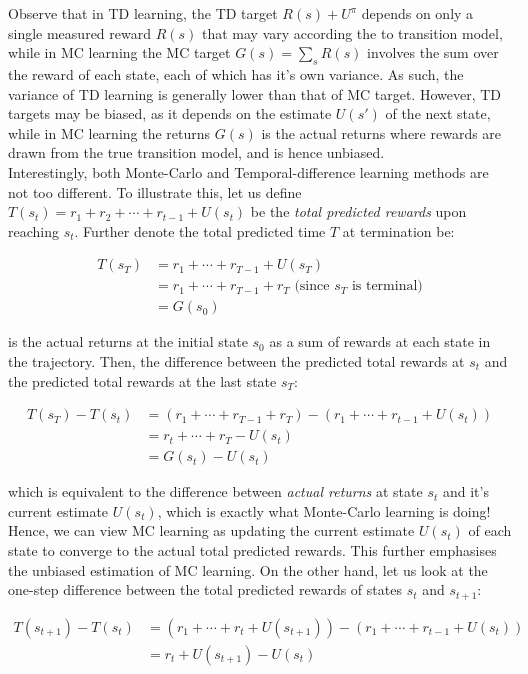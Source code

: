 \documentclass[11pt]{article}
\begin{document}
Observe that in TD learning, the TD target $R(s) + U^{\pi}$ depends on only a single measured reward $R(s)$ that may vary according the to transition model, while in MC learning the MC target $G(s) = \sum_{s} R(s)$ involves the sum over the reward of each state, each of which has it's own variance. As such, the variance of TD learning is generally lower than that of MC target. However, TD targets may be biased, as it depends on the estimate $U(s')$ of the next state, while in MC learning the returns $G(s)$ is the actual returns where rewards are drawn from the true transition model, and is hence unbiased.\\

Interestingly, both Monte-Carlo and Temporal-difference learning methods are not too different. To illustrate this, let us define $T(s_t) = r_1 + r_2 + \cdots + r_{t-1} + U(s_t)$ be the \textit{total predicted rewards} upon reaching $s_t$. Further denote the total predicted time $T$ at termination be:

$$
\begin{aligned}
T(s_T) &= r_1 + \cdots + r_{T-1} + U(s_T)\\
&= r_1 + \cdots + r_{T-1} + r_T \text{ (since $s_T$ is terminal)}\\
&= G(s_0)
\end{aligned}
$$

is the actual returns at the initial state $s_0$ as a sum of rewards at each state in the trajectory. Then, the difference between the predicted total rewards at $s_t$ and the predicted total rewards at the last state $s_T$:

$$
\begin{aligned}
T(s_T) - T(s_t) &= (r_1 + \cdots + r_{T-1} + r_T) - (r_1 + \cdots + r_{t-1} + U(s_t)) \\
&= r_t + \cdots + r_T - U(s_t) \\
&= G(s_t) - U(s_t)
\end{aligned}
$$

which is equivalent to the difference between \textit{actual returns} at state $s_t$ and it's current estimate $U(s_t)$, which is exactly what Monte-Carlo learning is doing! Hence, we can view MC learning as updating the current estimate $U(s_t)$ of each state to converge to the actual total predicted rewards. This further emphasises the unbiased estimation of MC learning. On the other hand, let us look at the one-step difference between the total predicted rewards of states $s_t$ and $s_{t+1}$:

$$
\begin{aligned}
T(s_{t+1}) - T(s_t) &= (r_1 + \cdots + r_t + U(s_{t+1})) - (r_1 + \cdots + r_{t-1} + U(s_t)) \\
&= r_t + U(s_{t+1}) - U(s_t) 
\end{aligned}
$$
\end{document}
